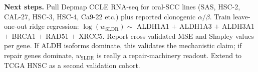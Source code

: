\textbf{Next steps.} Pull Depmap CCLE RNA-seq for oral-SCC lines (SAS, HSC-2, CAL-27, HSC-3,
HSC-4, Ca9-22 etc.) plus reported clonogenic $\alpha/\beta$. Train leave-one-out ridge
regression: $\log(w_{\mathrm{SLDR}}) \sim$ ALDH1A1 $+$ ALDH1A3 $+$ ALDH3A1 $+$ BRCA1 $+$ RAD51
$+$ XRCC5. Report cross-validated MSE and Shapley values per gene. If ALDH isoforms dominate,
this validates the mechanistic claim; if repair genes dominate, $w_{\mathrm{SLDR}}$ is really a
repair-machinery readout. Extend to TCGA HNSC as a second validation cohort.
